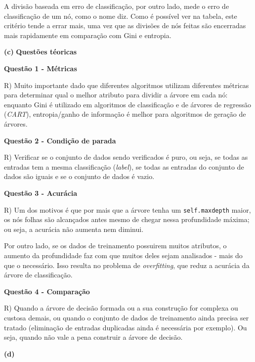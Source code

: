 \documentclass{article}
\begin{document}
\qquad A divisão baseada em erro de classificação, por outro lado, mede o erro de classificação de um nó, como o nome diz. Como é possível ver na tabela, este critério tende a errar mais, uma vez que as divisões de nós feitas são encerradas mais rapidamente em comparação com Gini e entropia.

\bigskip
\quad \textbf{(c)}\textbf{ Questões téoricas}

\bigskip
\quad \textbf{\large{Questão 1 - Métricas}}

\qquad R) Muito importante dado que diferentes algoritmos utilizam diferentes métricas para determinar qual o melhor atributo para dividir a árvore em cada nó: enquanto Gini é utilizado em algoritmos de classificação e de árvores de regressão (\textit{CART}), entropia/ganho de informação é melhor para algoritmos de geração de árvores.

\bigskip
\quad\textbf{\large{Questão 2 - Condição de parada}}

\qquad R) Verificar se o conjunto de dados sendo verificados é puro, ou seja, se todas as entradas tem a mesma classificação (\textit{label}), se todas as entradas do conjunto de dados são iguais e se o conjunto de dados é vazio.

\bigskip
\quad\textbf{\large{Questão 3 - Acurácia}}

\qquad R) Um dos motivos é que por mais que a árvore tenha um \texttt{self.maxdepth} maior, os nós folhas são alcançados antes mesmo de chegar nessa profundidade máxima; ou seja, a acurácia não aumenta nem diminui.

\qquad Por outro lado, se os dados de treinamento possuirem muitos atributos, o aumento da profundidade faz com que muitos deles sejam analisados - mais do que o necessário. Isso resulta no problema de \textit{overfitting}, que reduz a acurácia da árvore de classificação.

\bigskip
\quad\textbf{\large{Questão 4 - Comparação}}

\qquad R) Quando a árvore de decisão formada ou a sua construção for complexa ou custosa demais, ou quando o conjunto de dados de treinamento ainda precisa ser tratado (eliminação de entradas duplicadas ainda é necessária por exemplo). Ou seja, quando não vale a pena construir a árvore de decisão.

\bigskip
\quad \textbf{(d)}
\end{document}
